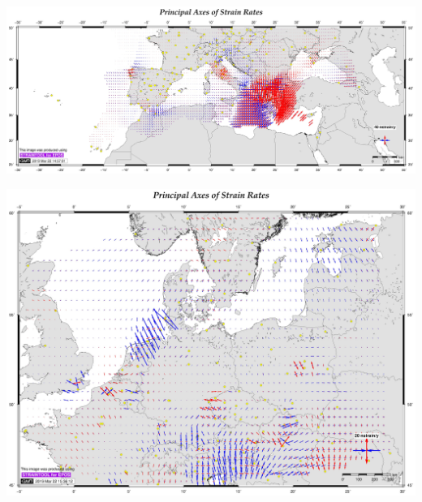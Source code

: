 \documentclass[landscape,a0paper,fontscale=0.346]{baposter} %
\begin{document}
\begin{poster}
{\begin{minipage}[b]{0.60\linewidth}
     \includegraphics[width=1.07\textwidth]{e14s050506-output_str-S.jpg}


\end{minipage}\hfill
\begin{minipage}[b]{0.36\linewidth}
     \includegraphics[width=.94\textwidth]{e14np050506e-output_str.jpg}
     
     

\end{minipage}}
\end{poster}
\end{document}

